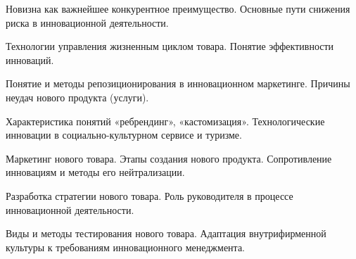 \documentclass[
	14pt,
	a4paper,
	]
	{scrartcl}
\begin{document}
\shapk
{}
\setcounter{zad}{0}

\vfill
\z Новизна как важнейшее конкурентное преимущество.
 \vfill
\z Основные пути снижения риска в инновационной деятельности.
 \vfill

\vfill

\newpage


\shapk
{}
\setcounter{zad}{0}

\vfill
\z Технологии управления жизненным циклом товара.
 \vfill
\z Понятие эффективности инноваций.
 \vfill

\vfill

\newpage


\shapk
{}
\setcounter{zad}{0}

\vfill
\z Понятие и методы репозиционирования в инновационном маркетинге.
 \vfill
\z Причины неудач нового продукта (услуги).
 \vfill

\vfill

\newpage


\shapk
{}
\setcounter{zad}{0}

\vfill
\z Характеристика понятий «ребрендинг», «кастомизация».
 \vfill
\z Технологические инновации в социально-культурном сервисе и туризме.
 \vfill

\vfill

\newpage


\shapk
{}
\setcounter{zad}{0}

\vfill
\z Маркетинг нового товара. Этапы создания нового продукта.
 \vfill
\z Сопротивление инновациям и методы его нейтрализации.
 \vfill

\vfill

\newpage


\shapk
{}
\setcounter{zad}{0}

\vfill
\z Разработка стратегии нового товара.
 \vfill
\z Роль руководителя в процессе инновационной деятельности.
 \vfill

\vfill

\newpage


\shapk
{}
\setcounter{zad}{0}

\vfill
\z Виды и методы тестирования нового товара.
 \vfill
\z Адаптация внутрифирменной культуры к требованиям инновационного менеджмента.
 \vfill

\vfill

\newpage
\end{document}
